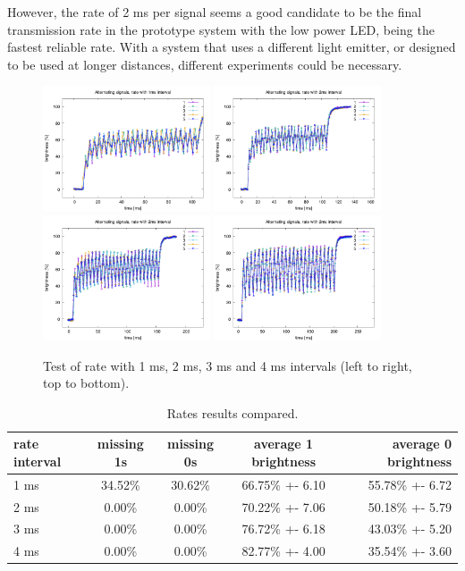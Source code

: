 However, the rate of 2 ms per signal seems a good candidate to be the final transmission rate in the prototype system with the low power LED, being the fastest reliable rate.
With a system that uses a different light emitter, or designed to be used at longer distances, different experiments could be necessary.
\begin{figure}[hbt]
\centering
  \includegraphics[height=140px]{img/overlap1}
  \includegraphics[height=140px]{img/overlap2}
  \includegraphics[height=140px]{img/overlap3}
  \includegraphics[height=140px]{img/overlap4}
  \caption{Test of rate with 1 ms, 2 ms, 3 ms and 4 ms intervals (left to right, top to bottom).}
  \label{fig:txpeak}
\end{figure}

\begin{table}[hbt]
\centering
 \begin{tabular}{l c c c r}
   rate interval & missing 1s & missing 0s & average 1 brightness & average 0 brightness \\
   \hline
   1 ms & 34.52\% & 30.62\% & 66.75\% +- 6.10 & 55.78\% +- 6.72 \\
   2 ms & 0.00\% & 0.00\% & 70.22\% +- 7.06 & 50.18\% +- 5.79 \\
   3 ms & 0.00\% & 0.00\% & 76.72\% +- 6.18 & 43.03\% +- 5.20 \\
   4 ms & 0.00\% & 0.00\% & 82.77\% +- 4.00 & 35.54\% +- 3.60 \\
   \hline
	\end{tabular}
  \caption{Rates results compared.}
  \label{ratestable}
\end{table}

